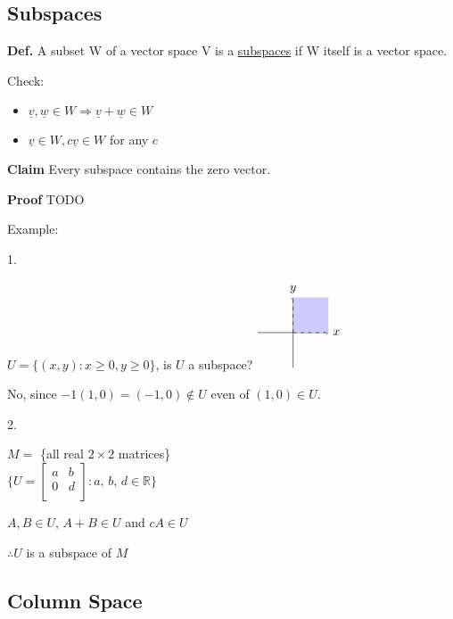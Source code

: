 \documentclass[12pt,a4paper]{article}
\begin{document}
\subsection*{Subspaces}

\textbf{Def.} A subset W of a vector space V is a \underline{subspaces} if W itself is a vector space.

Check:

\begin{itemize}
  \item $\underline{v}, \underline{w} \in W \Rightarrow \underline{v} + \underline{w} \in W$
  \item $\underline{v} \in W, c\underline{v} \in W$ for any $c$
\end{itemize}

\textbf{Claim} Every subspace contains the zero vector.

\textbf{Proof} TODO

Example:

1. 

$U = \{(x, y): x \geq 0, y \geq 0\}$, is $U$ a subspace?
$
\begin{tikzpicture}
  \draw[->] (-1, 0) -- (1, 0) node[right] {$x$};
  \draw[->] (0, -1) -- (0, 1) node[above] {$y$};

  \fill[color=blue!20] (0,0) rectangle (1,1);
    
  \draw[dashed] (0,0) -- (1,0);
  \draw[dashed] (0,0) -- (0,1);
\end{tikzpicture}
$

No, since $-1(1, 0) = (-1, 0) \notin U$ even of $(1, 0) \in U$.

2.

$M =$ \{all real $2 \times 2$ matrices\} \\
$
\{
  U = 
  \begin{bmatrix}
    a & b \\
    0 & d \\
  \end{bmatrix}:
  a,\,b,\,d \in \mathbb{R}
\}
$

$A, B \in U$, $A + B \in U$ and $cA \in U$

$\therefore U$ is a subspace of $M$ 

\subsection*{Column Space}
\end{document}
